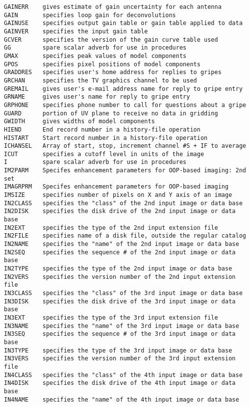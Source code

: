\begin{verbatim}
GAINERR    gives estimate of gain uncertainty for each antenna
GAIN       specifies loop gain for deconvolutions
GAINUSE    specifies output gain table or gain table applied to data
GAINVER    specifies the input gain table
GCVER      specifies the version of the gain curve table used
GG         spare scalar adverb for use in procedures
GMAX       specifies peak values of model components
GPOS       specifies pixel positions of model components
GRADDRES   specifies user's home address for replies to gripes
GRCHAN     specifies the TV graphics channel to be used
GREMAIL    gives user's e-mail address name for reply to gripe entry
GRNAME     gives user's name for reply to gripe entry
GRPHONE    specifies phone number to call for questions about a gripe
GUARD      portion of UV plane to receive no data in gridding
GWIDTH     gives widths of model components
HIEND      End record number in a history-file operation
HISTART    Start record number in a history-file operation
ICHANSEL   Array of start, stop, increment channel #S + IF to average
ICUT       specifies a cutoff level in units of the image
I          spare scalar adverb for use in procedures
IM2PARM    Specifes enhancement parameters for OOP-based imaging: 2nd set
IMAGRPRM   Specifes enhancement parameters for OOP-based imaging
IMSIZE     specifies number of pixels on X and Y axis of an image
IN2CLASS   specifies the "class" of the 2nd input image or data base
IN2DISK    specifies the disk drive of the 2nd input image or data base
IN2EXT     specifies the type of the 2nd input extension file
IN2FILE    specifies name of a disk file, outside the regular catalog
IN2NAME    specifies the "name" of the 2nd input image or data base
IN2SEQ     specifies the sequence # of the 2nd input image or data base
IN2TYPE    specifies the type of the 2nd input image or data base
IN2VERS    specifies the version number of the 2nd input extension file
IN3CLASS   specifies the "class" of the 3rd input image or data base
IN3DISK    specifies the disk drive of the 3rd input image or data base
IN3EXT     specifies the type of the 3rd input extension file
IN3NAME    specifies the "name" of the 3rd input image or data base
IN3SEQ     specifies the sequence # of the 3rd input image or data base
IN3TYPE    specifies the type of the 3rd input image or data base
IN3VERS    specifies the version number of the 3rd input extension file
IN4CLASS   specifies the "class" of the 4th input image or data base
IN4DISK    specifies the disk drive of the 4th input image or data base
IN4NAME    specifies the "name" of the 4th input image or data base

\end{verbatim}

